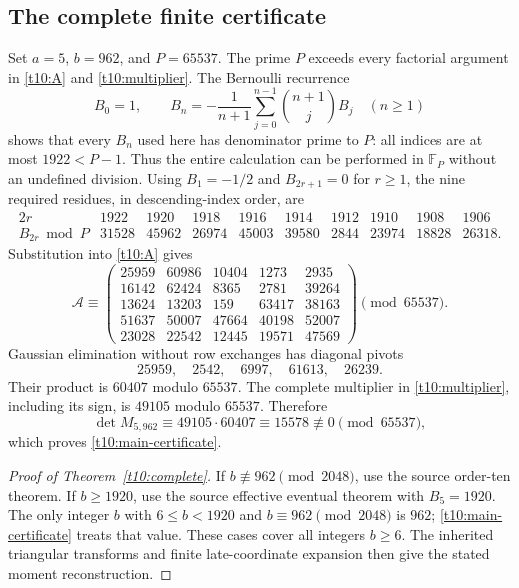 \documentclass[11pt,letterpaper]{article}
\numberwithin{equation}{section}
\theoremstyle{definition}
\theoremstyle{remark}
\begin{document}
\subsection{The complete finite certificate}

Set $a=5$, $b=962$, and $P=65537$. The prime $P$ exceeds every
factorial argument in \eqref{t10:A} and \eqref{t10:multiplier}.
The Bernoulli recurrence
\begin{equation}\label{t10:Brec}
 B_0=1,\qquad
 B_n=-\frac1{n+1}\sum_{j=0}^{n-1}\binom{n+1}{j}B_j
 \quad(n\ge1)
\end{equation}
shows that every $B_n$ used here has denominator prime to $P$:
all indices are at most $1922<P-1$. Thus the entire calculation
can be performed in $\mathbb F_P$ without an undefined division.
Using $B_1=-1/2$ and $B_{2r+1}=0$ for $r\ge1$, the nine required
residues, in descending-index order, are
\begin{equation}\label{t10:Bvalues}
\begin{array}{c|rrrrrrrrr}
2r&1922&1920&1918&1916&1914&1912&1910&1908&1906\\\hline
 B_{2r}\bmod P&31528&45962&26974&45003&39580&2844&23974&18828&26318.
\end{array}
\end{equation}
Substitution into \eqref{t10:A} gives
\begin{equation}\label{t10:Amatrix}
\mathcal A\equiv
\begin{pmatrix}
25959&60986&10404&1273&2935\\
16142&62424&8365&2781&39264\\
13624&13203&159&63417&38163\\
51637&50007&47664&40198&52007\\
23028&22542&12445&19571&47569
\end{pmatrix}\pmod{65537}.
\end{equation}
Gaussian elimination without row exchanges has diagonal pivots
\[
25959,\quad2542,\quad6997,\quad61613,\quad26239.
\]
Their product is $60407$ modulo $65537$. The complete multiplier
in \eqref{t10:multiplier}, including its sign, is $49105$ modulo
$65537$. Therefore
\[
\det M_{5,962}\equiv49105\cdot60407\equiv15578\not\equiv0
     \pmod{65537},
\]
which proves \eqref{t10:main-certificate}.

\begin{proof}[Proof of Theorem~\ref{t10:complete}]
If $b\not\equiv962\pmod{2048}$, use the source order-ten theorem.
If $b\ge1920$, use the source effective eventual theorem with
$B_5=1920$. The only integer $b$ with
$6\le b<1920$ and $b\equiv962\pmod{2048}$ is $962$;
\eqref{t10:main-certificate} treats that value. These cases cover
all integers $b\ge6$. The inherited triangular transforms and
finite late-coordinate expansion then give the stated moment
reconstruction.\end{proof}
\end{document}
